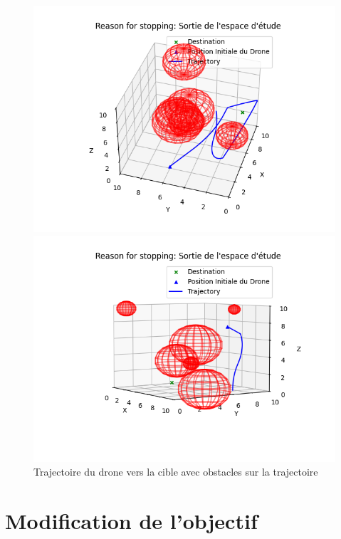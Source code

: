 \documentclass[a4paper, 12pt]{article}
\begin{document}
\begin{figure}[h]
    \centering
    \begin{minipage}{0.45\textwidth}
        \centering
        \includegraphics[width=\textwidth]{Figure_9.png}
    \end{minipage}
    \hfill
    \begin{minipage}{0.45\textwidth}
        \centering
        \includegraphics[width=\textwidth]{Figure_10.png}
    \end{minipage}
    \caption{Trajectoire du drone vers la cible avec obstacles sur la trajectoire}
\end{figure}
\section{Modification de l'objectif}
\end{document}
